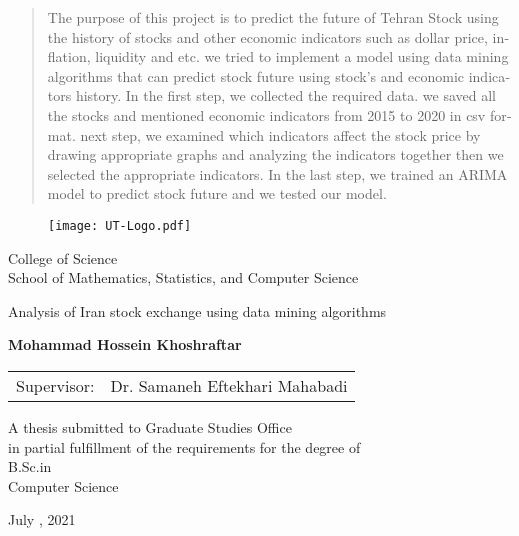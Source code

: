 \documentclass[12pt]{report}
\begin{document}
\begin{latin}
\begin{abstract}
The purpose of this project is to predict the future of Tehran Stock using the history of stocks and other economic indicators such as dollar price, inflation, liquidity and etc. we tried to implement a model using data mining algorithms that can predict stock future using stock's and economic indicators history. In the first step, we collected the required data. we saved all the stocks and mentioned economic indicators from 2015 to 2020 in csv format. next step, we examined which indicators affect the stock price by drawing appropriate graphs and analyzing the indicators together then we selected the appropriate indicators. In the last step, we trained an ARIMA model to predict stock future and we tested our model.
\end{abstract}
\newpage

\begin{figure}
\centering
\texttt{[image: UT-Logo.pdf]}
\end{figure}
\begin{center}

College of Science\\
School of Mathematics, Statistics, and Computer Science
\end{center}

\begin{center}
\huge{Analysis of Iran stock exchange using data mining algorithms}
\end{center}

\begin{center}
\end{center}

\begin{center}
\textbf{
Mohammad Hossein Khoshraftar
}
\end{center}

\begin{center}
\begin{tabular}{rr}
Supervisor: & Dr. Samaneh Eftekhari Mahabadi \\

\end{tabular}
\end{center}

\vspace{3cm}
\begin{center}
A thesis submitted to Graduate Studies Office\\
in partial fulfillment of the requirements for the degree of \\
B.Sc.in\\
 Computer Science
\end{center}

\begin{center}
July , 2021
\end{center}

\pagenumbering{}

\end{latin}
\end{document}
